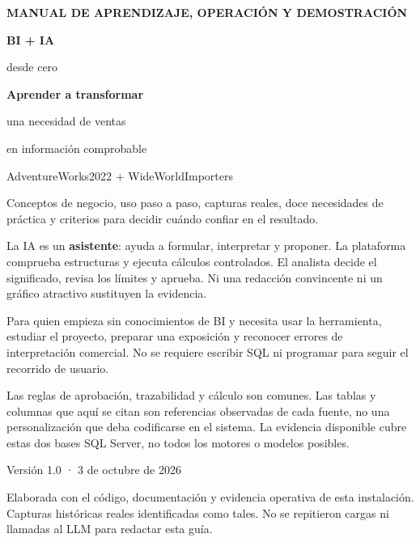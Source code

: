 \documentclass[11pt,a4paper]{article}
\newcommand{\eyebrow}[1]{{\small\bfseries\color{teal}\MakeUppercase{#1}}\par}
\newcommand{\sub}[1]{\par\vspace{2mm}{\large\bfseries\color{navy}#1\par}}
\begin{document}
\thispagestyle{empty}
\eyebrow{Manual de aprendizaje, operación y demostración}
\vspace{8mm}
{\fontsize{33}{37}\selectfont\bfseries\color{navy}BI + IA\par desde cero\par}
\vspace{4mm}
{\fontsize{23}{27}\selectfont\bfseries\color{navy}Aprender a transformar\par una necesidad de ventas\par en información comprobable\par}
\vspace{5mm}
{\Large\color{teal}AdventureWorks2022 + WideWorldImporters\par}
\vspace{5mm}
{\large Conceptos de negocio, uso paso a paso, capturas reales, doce necesidades de práctica y criterios para decidir cuándo confiar en el resultado.\par}
\vspace{5mm}
\begin{good}
La IA es un \textbf{asistente}: ayuda a formular, interpretar y proponer. La plataforma comprueba estructuras y ejecuta cálculos controlados. El analista decide el significado, revisa los límites y aprueba. Ni una redacción convincente ni un gráfico atractivo sustituyen la evidencia.
\end{good}
\sub{Para quién está escrita}
Para quien empieza sin conocimientos de BI y necesita usar la herramienta, estudiar el proyecto, preparar una exposición y reconocer errores de interpretación comercial. No se requiere escribir SQL ni programar para seguir el recorrido de usuario.
\begin{note}
Las reglas de aprobación, trazabilidad y cálculo son comunes. Las tablas y columnas que aquí se citan son referencias observadas de cada fuente, no una personalización que deba codificarse en el sistema. La evidencia disponible cubre estas dos bases SQL Server, no todos los motores o modelos posibles.
\end{note}
\vfill
{\small\color{muted}Versión 1.0 · 3 de octubre de 2026\par
Elaborada con el código, documentación y evidencia operativa de esta instalación. Capturas históricas reales identificadas como tales. No se repitieron cargas ni llamadas al LLM para redactar esta guía.}

\clearpage
\renewcommand{\contentsname}{Ruta de lectura}
{\small\tableofcontents}


\end{document}
